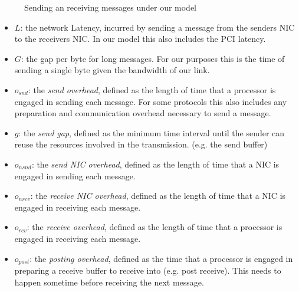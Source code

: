 \begin{figure}[!htp]
\begin{center}
\end{center}
\caption{Sending an receiving messages under our model}
\label{fig:model-base}
\end{figure}




\begin{itemize}
  \item $L$: the network Latency, incurred by sending a message from the senders NIC to the receivers NIC. In our model 
    this also includes the PCI latency.
  \item $G$: the gap per byte for long messages. For our purposes this is the time of sending a single byte given the 
     bandwidth of our link.
  \item $o_{snd}$: the \emph{send overhead}, defined as the length of time that a processor is engaged in sending each message.
    For some protocols this also includes any preparation and communication overhead necessary to send a message.
  \item $g$: the \emph{send gap}, defined as the minimum time interval until the sender can reuse the resources involved in 
    the transmission. (e.g. the send buffer) 
  \item $o_{nsnd}$: the \emph{send NIC overhead}, defined as the length of time that a NIC is engaged in sending each message.
  \item $o_{nrcv}$: the \emph{receive NIC overhead}, defined as the length of time that a NIC is engaged in receiving each message.
  \item $o_{rcv}$: the \emph{receive overhead}, defined as the length of time that a processor is engaged in receiving each message.
  \item $o_{post}$: the \emph{posting overhead}, defined as the time that a processor is engaged in preparing a receive buffer
    to receive into (e.g. post receive). This needs to happen sometime before receiving the next message.
\end{itemize}

